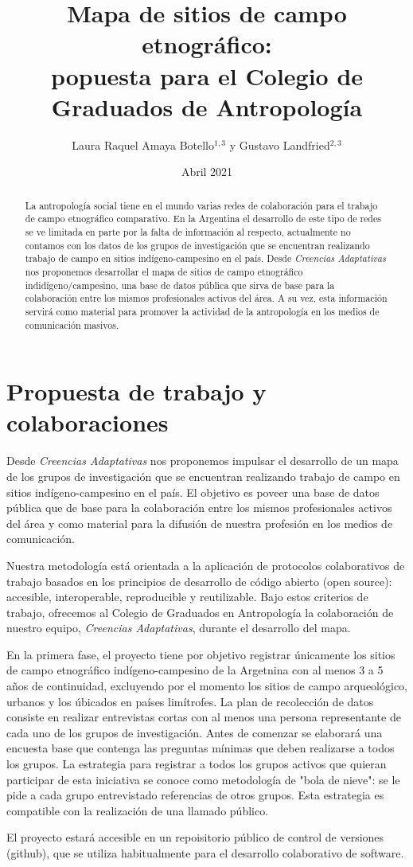 \documentclass{article}
\title{Mapa de sitios de campo etnográfico: \\ \large popuesta para el Colegio de Graduados de Antropología}
\author{Laura Raquel Amaya Botello$^{1,3}$ y Gustavo Landfried$^{2,3}$}
\affil{\small 1 Universidad Nacional de Colombia. 2 Universidad de Buenos Aires. 3 Creencias Adaptativas}
\affil[]{Correspondencia: \url{lramayab@unal.edu.co}}
\date{Abril 2021}
\begin{document}
\maketitle

\begin{abstract}
  La antropología social tiene en el mundo varias redes de colaboración para el trabajo de campo etnográfico comparativo.
  En la Argentina el desarrollo de este tipo de redes se ve limitada en parte por la falta de información al respecto, actualmente no contamos con los datos de los grupos de investigación que se encuentran realizando trabajo de campo en sitios indígeno-campesino en el país.
  Desde \emph{Creencias Adaptativas} nos proponemos desarrollar el mapa de sitios de campo etnográfico indidígeno/campesino, una base de datos pública que sirva de base para la colaboración entre los mismos profesionales activos del área.
  A su vez, esta información servirá como material para promover la actividad de la antropología en los medios de comunicación masivos.
\end{abstract}

\section*{Propuesta de trabajo y colaboraciones}

Desde \emph{Creencias Adaptativas} nos proponemos impulsar el desarrollo de un mapa de los grupos de investigación que se encuentran realizando trabajo de campo en sitios indígeno-campesino en el país.
El objetivo es poveer una base de datos pública que de base para la colaboración entre los mismos profesionales activos del área y como material para la difusión de nuestra profesión en los medios de comunicación.

Nuestra metodología está orientada a la aplicación de protocolos colaborativos de trabajo basados en los principios de desarrollo de código abierto (open source): accesible, interoperable, reproducible y reutilizable.
Bajo estos criterios de trabajo, ofrecemos al Colegio de Graduados en Antropología la colaboración de nuestro equipo, \emph{Creencias Adaptativas}, durante el desarrollo del mapa.

En la primera fase, el proyecto tiene por objetivo registrar únicamente los sitios de campo etnográfico indígeno-campesino de la Argetnina con al menos 3 a 5 años de continuidad, excluyendo por el momento los sitios de campo arqueológico, urbanos y los úbicados en países limítrofes.
La plan de recolección de datos consiste en realizar entrevistas cortas con al menos una persona representante de cada uno de los grupos de investigación.
Antes de comenzar se elaborará una encuesta base que contenga las preguntas mínimas que deben realizarse a todos los grupos.
La estrategia para registrar a todos los grupos activos que quieran participar de esta iniciativa se conoce como metodología de "bola de nieve": se le pide a cada grupo entrevistado referencias de otros grupos.
Esta estrategia es compatible con la realización de una llamado público.

El proyecto estará accesible en un repoisitorio público de control de versiones (github), que se utiliza habitualmente para el desarrollo colaborativo de software.
\end{document}
